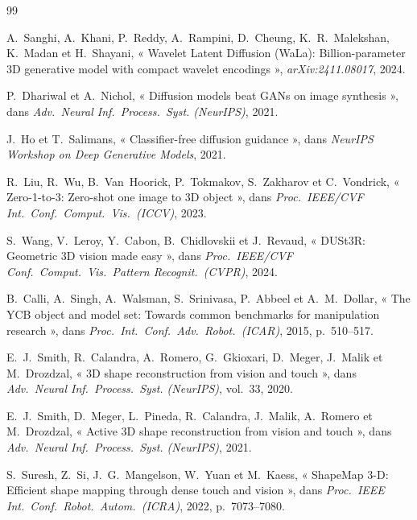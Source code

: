 \documentclass[conference]{IEEEtran}
\begin{document}
\balance
\begin{thebibliography}{99}


A.~Sanghi, A.~Khani, P.~Reddy, A.~Rampini, D.~Cheung, K.~R.~Malekshan, K.~Madan et
H.~Shayani, « Wavelet Latent Diffusion (WaLa): Billion-parameter 3D generative model
with compact wavelet encodings », \emph{arXiv:2411.08017}, 2024.

P.~Dhariwal et A.~Nichol, « Diffusion models beat GANs on image synthesis », dans
\emph{Adv.\ Neural Inf.\ Process.\ Syst. (NeurIPS)}, 2021.

J.~Ho et T.~Salimans, « Classifier-free diffusion guidance », dans \emph{NeurIPS
Workshop on Deep Generative Models}, 2021.

R.~Liu, R.~Wu, B.~Van~Hoorick, P.~Tokmakov, S.~Zakharov et C.~Vondrick,
« Zero-1-to-3: Zero-shot one image to 3D object », dans \emph{Proc.\ IEEE/CVF Int.\
Conf.\ Comput.\ Vis.\ (ICCV)}, 2023.

S.~Wang, V.~Leroy, Y.~Cabon, B.~Chidlovskii et J.~Revaud, « DUSt3R: Geometric 3D
vision made easy », dans \emph{Proc.\ IEEE/CVF Conf.\ Comput.\ Vis.\ Pattern
Recognit.\ (CVPR)}, 2024.

B.~Calli, A.~Singh, A.~Walsman, S.~Srinivasa, P.~Abbeel et A.~M.~Dollar, « The YCB
object and model set: Towards common benchmarks for manipulation research », dans
\emph{Proc.\ Int.\ Conf.\ Adv.\ Robot.\ (ICAR)}, 2015, p.~510--517.

E.~J.~Smith, R.~Calandra, A.~Romero, G.~Gkioxari, D.~Meger, J.~Malik et M.~Drozdzal,
« 3D shape reconstruction from vision and touch », dans \emph{Adv.\ Neural Inf.\
Process.\ Syst. (NeurIPS)}, vol.~33, 2020.

E.~J.~Smith, D.~Meger, L.~Pineda, R.~Calandra, J.~Malik, A.~Romero et M.~Drozdzal,
« Active 3D shape reconstruction from vision and touch », dans \emph{Adv.\ Neural
Inf.\ Process.\ Syst. (NeurIPS)}, 2021.

S.~Suresh, Z.~Si, J.~G.~Mangelson, W.~Yuan et M.~Kaess, « ShapeMap 3-D: Efficient
shape mapping through dense touch and vision », dans \emph{Proc.\ IEEE Int.\ Conf.\
Robot.\ Autom.\ (ICRA)}, 2022, p.~7073--7080.


\end{thebibliography}
\end{document}
